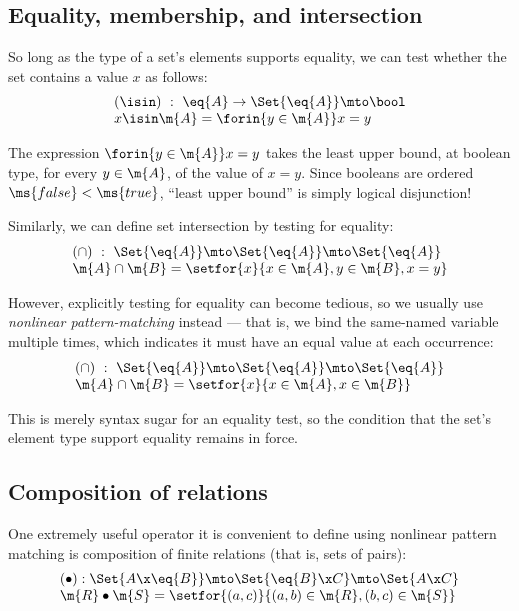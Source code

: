 
\subsection{Equality, membership, and intersection}

So long as the type of a set's elements supports equality, we can test whether
the set contains a value $x$ as follows:
\[\begin{array}{l}
(\isin) ~:~ \eq{A} \uto \Set{\eq{A}} \mto \bool\\
x \isin \m{A} = \forin{y \in \m{A}} x = y
\end{array}\]

The expression $\forin{y \in \m{A}} x = y$ takes the least upper bound, at
boolean type, for every $y \in \m{A}$, of the value of $x = y$. Since booleans
are ordered $\ms{false} < \ms{true}$, ``least upper bound'' is simply logical
disjunction! %

Similarly, we can define set intersection by testing for equality:
\[\begin{array}{l}
(\cap) ~:~ \Set{\eq{A}} \mto \Set{\eq{A}} \mto \Set{\eq{A}}\\
\m{A} \cap \m{B} = \setfor{x}{x \in \m{A}, y \in \m{B}, x = y}
\end{array}\]

However, explicitly testing for equality can become tedious, so we usually use
\emph{nonlinear pattern-matching} instead --- that is, we bind the same-named
variable multiple times, which indicates it must have an equal value at each
occurrence:
\[\begin{array}{l}
(\cap) ~:~ \Set{\eq{A}} \mto \Set{\eq{A}} \mto \Set{\eq{A}}\\
\m{A} \cap \m{B} = \setfor{x}{x \in \m{A}, x \in \m{B}}
\end{array}\]

This is merely syntax sugar for an equality test, so the condition that the
set's element type support equality remains in force.



\subsection{Composition of relations}

One extremely useful operator it is convenient to define using nonlinear pattern
matching is composition of finite relations (that is, sets of pairs):
\[\begin{array}{l}
(\bullet) : \Set{A \x \eq{B}} \mto \Set{\eq{B} \x C} \mto \Set{A \x C}\\
\m{R} \bullet \m{S} = \setfor{(a,c)}{(a,b) \in \m{R}, (b,c) \in \m{S}}
\end{array}\]

